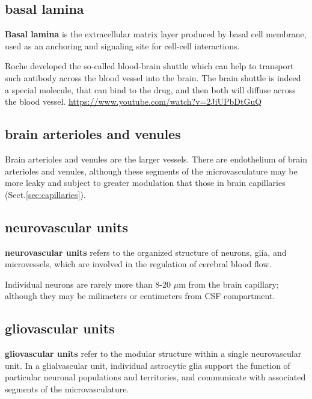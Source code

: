 \subsection{basal lamina}
\label{sec:basal-lamina}

{\bf Basal lamina} is the extracellular matrix layer produced by basal cell
membrane, used as an anchoring and signaling site for cell-cell interactions.


\begin{mdframed}
Roche developed the so-called {blood-brain shuttle} which can help to
transport such antibody across the blood vessel into the brain.
The brain shuttle is indeed a special molecule, that can bind to the drug, and
then both will diffuse across the blood vessel.
\url{https://www.youtube.com/watch?v=2JiUPbDtGuQ}

\end{mdframed}

\subsection{brain arterioles and venules}
\label{sec:arterioles}
\label{sec:venules}

Brain arterioles and venules are the larger vessels. There are endothelium of
brain arterioles and venules, although these segments of the microvasculature
may be more leaky and subject to greater modulation that those in brain
capillaries (Sect.\ref{sec:capillaries}).


\subsection{neurovascular units}

{\bf neurovascular units} refers to the organized structure of neurons, glia,
and microvessels, which are involved in the regulation of cerebral blood flow.

Individual neurons are rarely more than 8-20 $\mu$m from the brain capillary;
although they may be milimeters or centimeters from CSF compartment.

\subsection{gliovascular units}

{\bf gliovascular units} refer to the modular structure within a single
neurovascular unit.  In a glialvascular unit, individual astrocytic glia support
the function of particular neuronal populations and territories, and communicate
with associated segments of the microvasculature.




